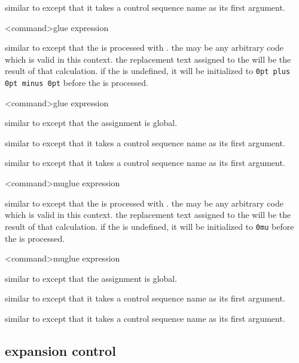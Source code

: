 \begin{ltxsyntax}
similar to  except that it takes a control sequence name as its first argument.

<command>{glue expression}

similar to  except that the  is processed with . the  may be any arbitrary code which is valid in this context. the replacement text assigned to the  will be the result of that calculation. if the  is undefined, it will be initialized to \texttt{0pt plus 0pt minus 0pt} before the  is processed.

<command>{glue expression}

similar to  except that the assignment is global.


similar to  except that it takes a control sequence name as its first argument.


similar to  except that it takes a control sequence name as its first argument.

<command>{muglue expression}

similar to  except that the  is processed with . the  may be any arbitrary code which is valid in this context. the replacement text assigned to the  will be the result of that calculation. if the  is undefined, it will be initialized to \texttt{0mu} before the  is processed.

<command>{muglue expression}

similar to  except that the assignment is global.


similar to  except that it takes a control sequence name as its first argument.


similar to  except that it takes a control sequence name as its first argument.

\end{ltxsyntax}

\subsection{expansion control}
\label{aut:exp}

